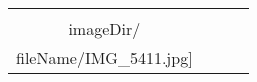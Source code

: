 \begin{table}
\begin{tabular}{cccc}
\texttt{[image: \\imageDir/\\fileName/IMG\_5411.jpg]} 
\end{tabular}
\end{table}
